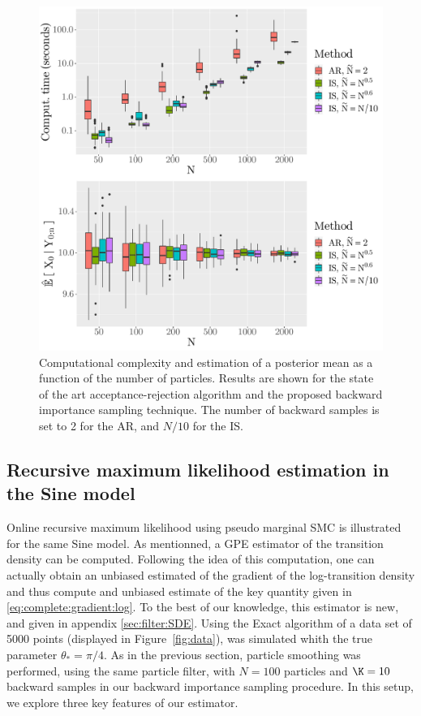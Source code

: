 \documentclass{article}
\newcommand{\parvec}{\theta}
\newcommand{\N}{N}
\begin{document}
\begin{figure}[h]
\begin{center}
\includegraphics[scale = .4]{comparing_IS_AR_N_vary.pdf}
\end{center}
\caption{Computational complexity and estimation of a posterior mean as a function of the number of particles. Results are shown for the state of the art acceptance-rejection algorithm and the proposed backward  importance sampling technique. The number of backward samples is set to 2 for the AR, and $N/10$ for the IS.}
\label{fig:sine:timeandbias:N:vary}
\end{figure}


\subsection{Recursive maximum likelihood estimation in the  Sine model}
\label{sec:simu:tangent:filter}
Online recursive maximum likelihood using pseudo marginal SMC is illustrated for the same Sine model.
As mentionned, a GPE estimator of the transition density can be computed. 
Following the idea of this computation, one can actually obtain an unbiased estimated of the gradient of the log-transition density and thus compute and unbiased estimate of the key quantity given in \eqref{eq:complete:gradient:log}. 
To the best of our knowledge, this estimator is new, and given in appendix \ref{sec:filter:SDE}.
Using the Exact algorithm of \cite{beskos2006retrospective} a data set of 5000 points (displayed in Figure~\ref{fig:data}), was simulated whith the true parameter $\parvec_* = \pi/4$. 
As in the previous section, particle smoothing was performed, using  the same particle filter, with $\N = 100$ particles and $\K = 10$ backward samples in our backward importance sampling procedure. 
In this setup, we explore three key features of our estimator.
\end{document}
